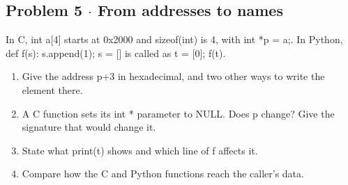 \documentclass[11pt]{article}
\begin{document}
\begin{keepsection}
\begin{keepsection}
\subsection{Problem 5 \ensuremath{\cdot} From addresses to names}

In C, int a[4] starts at 0x2000 and sizeof(int) is 4, with int *p = a;. In Python, def f(s): s.append(1); s = [] is called as t = [0]; f(t).

\begin{enumerate}
\item Give the address p+3 in hexadecimal, and two other ways to write the element there.
\item A C function sets its int * parameter to NULL. Does p change? Give the signature that would change it.
\item State what print(t) shows and which line of f affects it.
\item Compare how the C and Python functions reach the caller’s data.
\end{enumerate}

\end{keepsection}
\end{keepsection}
\end{document}
